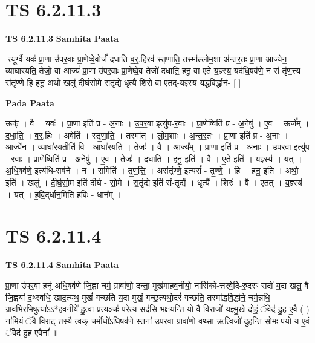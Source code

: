 \documentclass[17pt]{extarticle}
\begin{document}

\section{ TS 6.2.11.3 }

\textbf{TS 6.2.11.3 } \newline
\textbf{Samhita Paata} \newline

-त्यूर्ग्वै यवः॑ प्रा॒णा उ॑पर॒वाः प्रा॒णेष्वे॒वोर्जं॑ दधाति ब॒र्॒.हिरव॑ स्तृणाति॒ तस्मा᳚ल्लोम॒शा अ॑न्तर॒तः प्रा॒णा आज्ये॑न॒ व्याघा॑रयति॒ तेजो॒ वा आज्यं॑ प्रा॒णा उ॑पर॒वाः प्रा॒णेष्वे॒व तेजो॑ दधाति॒ हनू॒ वा ए॒ते य॒ज्ञ्स्य॒ यद॑धि॒षव॑णे॒ न सं तृ॑ण॒त्त्य स॑तृंण्णे॒ हि हनू॒ अथो॒ खलु॑ दीर्घसो॒मे स॒तृंद्ये॒ धृत्यै॒ शिरो॒ वा ए॒तद्-य॒ज्ञ्स्य॒ यद्ध॑वि॒र्द्धानं॑- [  ] \newline

\textbf{Pada Paata} \newline

ऊर्क् । वै । यवः॑ । प्रा॒णा इति॑ प्र - अ॒नाः । उ॒प॒र॒वा इत्यु॑प-र॒वाः । प्रा॒णेष्विति॑ प्र - अ॒नेषु॑ । ए॒व । ऊर्ज᳚म् । द॒धा॒ति॒ । ब॒र्॒.हिः । अवेति॑ । स्तृ॒णा॒ति॒ । तस्मा᳚त् । लो॒म॒शाः । अ॒न्त॒र॒तः । प्रा॒णा इति॑ प्र - अ॒नाः । आज्ये॑न । व्याघा॑रय॒तीति॑ वि - आघा॑रयति । तेजः॑ । वै । आज्य᳚म् । प्रा॒णा इति॑ प्र - अ॒नाः । उ॒प॒र॒वा इत्यु॑प - र॒वाः । प्रा॒णेष्विति॑ प्र - अ॒नेषु॑ । ए॒व । तेजः॑ । द॒धा॒ति॒ । हनू॒ इति॑ । वै । ए॒ते इति॑ । य॒ज्ञ्स्य॑ । यत् । अ॒धि॒षव॑णे॒ इत्य॑धि-सव॑ने । न । समिति॑ । तृ॒ण॒त्ति॒ । अस॑तृंण्णे॒ इत्यसं᳚ - तृ॒ण्णे॒ । हि । हनू॒ इति॑ । अथो॒ इति॑ । खलु॑ । दी॒र्घ॒सो॒म इति॑ दीर्घ - सो॒मे । स॒तृंद्ये॒ इति॑ सं-तृद्ये᳚ । धृत्यै᳚ । शिरः॑ । वै । ए॒तत् । य॒ज्ञ्स्य॑ । यत् । ह॒वि॒द्‌र्धान॒मिति॑ हविः - धान᳚म् ।  \newline





\section{ TS 6.2.11.4 }

\textbf{TS 6.2.11.4 } \newline
\textbf{Samhita Paata} \newline

प्रा॒णा उ॑पर॒वा हनू॑ अधि॒षव॑णे जि॒ह्वा चर्म॒ ग्रावा॑णो॒ दन्ता॒ मुख॑माहव॒नीयो॒ नासि॑को-त्तरवे॒दि-रु॒दरꣳ॒॒ सदो॑ य॒दा खलु॒ वै जि॒ह्वया॑ द॒थ्स्वधि॒ खाद॒त्यथ॒ मुखं॑ गच्छति य॒दा मुखं॒ गच्छ॒त्यथो॒दरं॑ गच्छति॒ तस्मा᳚द्धवि॒र्द्धाने॒ चर्म॒न्नधि॒ ग्राव॑भिरभि॒षुत्या॑ऽऽ*हव॒नीये॑ हु॒त्वा प्र॒त्यञ्चः॑ प॒रेत्य॒ सद॑सि भक्षयन्ति॒ यो वै वि॒राजो॑ यज्ञ्मु॒खे दोहं॒ ॅवेद॑ दु॒ह ए॒वै ( ) ना॑मि॒यं ॅवै वि॒राट् तस्यै॒ त्वक् चर्मोधो॑ऽधि॒षव॑णे॒ स्तना॑ उपर॒वा ग्रावा॑णो व॒थ्सा ऋ॒त्विजो॑ दुहन्ति॒ सोमः॒ पयो॒ य ए॒वं ॅवेद॑ दु॒ह ए॒वैनां᳚ ॥ \newline
\end{document}
